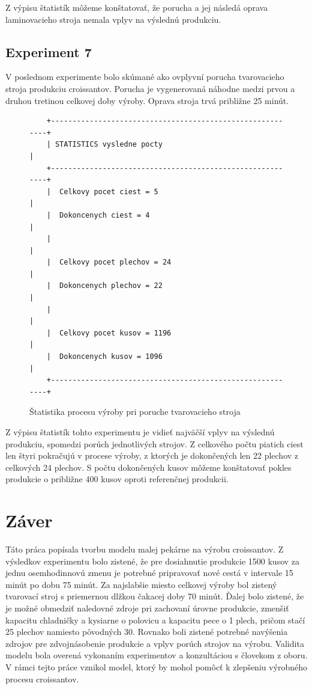 \documentclass[11pt]{article}
\begin{document}
Z výpisu štatistík môžeme konštatovať, že porucha a jej následá oprava laminovacieho stroja nemala vplyv na výslednú produkciu.

\subsection{Experiment 7}
V poslednom experimente bolo skúmané ako ovplyvní porucha tvarovacieho stroja produkciu croissantov. Porucha je vygenerovaná náhodne medzi prvou a druhou tretinou celkovej doby výroby. Oprava stroja trvá približne 25 minút.

\begin{figure}[H]
\begin{verbatim}
    +----------------------------------------------------------+
    | STATISTICS vysledne pocty                                |
    +----------------------------------------------------------+
    |  Celkovy pocet ciest = 5                                 |
    |  Dokoncenych ciest = 4                                   |
    |                                                          |
    |  Celkovy pocet plechov = 24                              |
    |  Dokoncenych plechov = 22                                |
    |                                                          |
    |  Celkovy pocet kusov = 1196                              |
    |  Dokoncenych kusov = 1096                                |
    +----------------------------------------------------------+
\end{verbatim}
\caption{Štatistika procesu výroby pri poruche tvarovacieho stroja}
\label{fig:mixer_failure_experiment}
\end{figure}

Z výpisu štatistík tohto experimentu je vidieť najväčší vplyv na výslednú produkciu, spomedzi porúch jednotlivých strojov. Z celkového počtu piatich ciest len štyri pokračujú v procese výroby, z ktorých je dokončených len 22 plechov z celkových 24 plechov. S počtu dokončených kusov môžeme konštatovať pokles produkcie o približne 400 kusov oproti referenčnej produkcii. 

\newpage
\section{Záver}
Táto práca popísala tvorbu modelu malej pekárne na výrobu croissantov. Z výsledkov experimentu bolo zistené, že pre dosiahnutie produkcie 1500 kusov za jednu osemhodinnovú zmenu je potrebné pripravovať nové cestá v intervale 15 minút po dobu 75 minút. Za najslabšie miesto celkovej výroby bol zistený tvarovací stroj s priemernou dlžkou čakacej doby 70 minút. Ďalej bolo zistené, že je možné obmedziť naledovné zdroje pri zachovaní úrovne produkcie, zmenšiť kapacitu chladničky a kysiarne o polovicu a kapacitu pece o 1 plech, pričom stačí 25 plechov namiesto pôvodných 30. Rovnako boli zistené potrebné navýšenia zdrojov pre zdvojnásobenie produkcie a vplyv porúch strojov na výrobu. Validita modelu bola overená vykonaním experimentov a konzultáciou s človekom z oboru. V rámci tejto práce vznikol model, ktorý by mohol pomôcť k zlepšeniu výrobného procesu croissantov.
\end{document}
